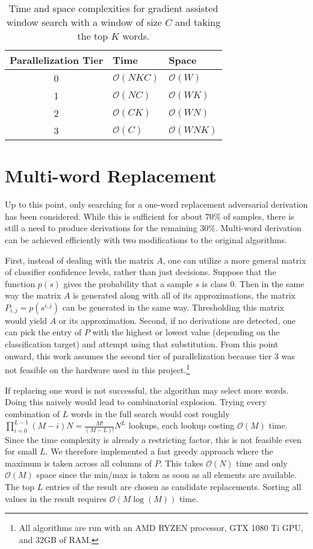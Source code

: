 \begin{table}
\centering
\begin{tabular}{ |c|l|l| } 
 \hline
 Parallelization Tier & Time & Space \\ \hline
 0&$\mathcal{O}(NKC)$ & $\mathcal{O}(W)$ \\
 1&$\mathcal{O}(NC)$ & $\mathcal{O}(WK)$ \\
 2&$\mathcal{O}(CK)$ & $\mathcal{O}(WN)$ \\
 3&$\mathcal{O}(C)$ & $\mathcal{O}(WNK)$ \\ \hline
\end{tabular}
\caption{Time and space complexities for gradient assisted window search with a window of size $C$ and taking the top $K$ words.}
\label{tab:gaws_complexity}
\end{table}
\section{Multi-word Replacement}
Up to this point, only searching for a one-word replacement adversarial derivation has been considered.  While this is sufficient for about $70\%$ of samples, there is still a need to produce derivations for the remaining $30\%$.  Multi-word derivation can be achieved efficiently with two modifications to the original algorithms.

First, instead of dealing with the matrix $A$, one can utilize a more general matrix of classifier confidence levels, rather than just decisions.  Suppose that the function $p(s)$ gives the probability that a sample $s$ is class $0$.  Then in the same way the matrix $A$ is generated along with all of its approximations, the matrix $P_{i,j} = p(s^{i,j})$ can be generated in the same way.  Thresholding this matrix would yield $A$ or its approximation.  Second, if no derivations are detected, one can pick the entry of $P$ with the highest or lowest value (depending on the classification target) and attempt using that substitution.  From this point onward, this work assumes the second tier of parallelization because tier 3 was not feasible on the hardware used in this project.\footnote{All algorithms are run with an AMD RYZEN processor, GTX 1080 Ti GPU, and 32GB of RAM.}

If replacing one word is not successful, the algorithm may select more words.  Doing this naively would lead to combinatorial explosion.  Trying every combination of $L$ words in the full search would cost roughly $\prod_{i=0}^{L-1} (M-i)N = \frac{M!}{(M-L)!}N^L$ lookups, each lookup costing $\mathcal{O}(M)$ time.  Since the time complexity is already a restricting factor, this is not feasible even for small $L$.  We therefore implemented a fast greedy approach where the maximum is taken across all columns of $P$.  This takes $\mathcal{O}(N)$ time and only $\mathcal{O}(M)$ space since the min/max is taken as soon as all elements are available.  The top $L$ entries of the result are chosen as candidate replacements.  Sorting all values in the result requires $\mathcal{O}(M\log(M))$ time.

